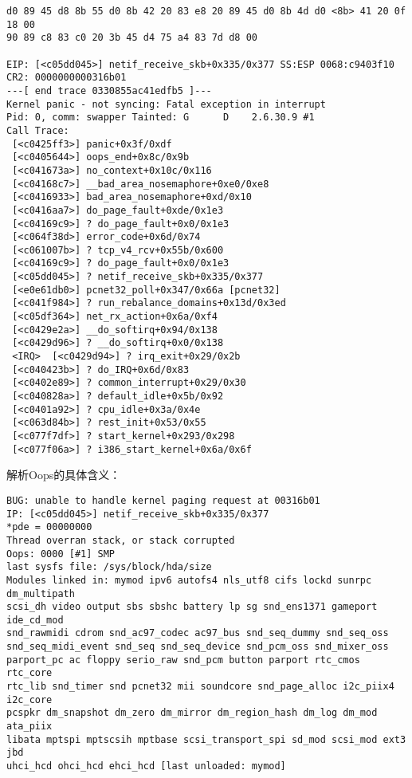 \begin{lstlisting}
d0 89 45 d8 8b 55 d0 8b 42 20 83 e8 20 89 45 d0 8b 4d d0 <8b> 41 20 0f 18 00 
90 89 c8 83 c0 20 3b 45 d4 75 a4 83 7d d8 00

EIP: [<c05dd045>] netif_receive_skb+0x335/0x377 SS:ESP 0068:c9403f10
CR2: 0000000000316b01
---[ end trace 0330855ac41edfb5 ]---
Kernel panic - not syncing: Fatal exception in interrupt
Pid: 0, comm: swapper Tainted: G      D    2.6.30.9 #1
Call Trace:
 [<c0425ff3>] panic+0x3f/0xdf
 [<c0405644>] oops_end+0x8c/0x9b
 [<c041673a>] no_context+0x10c/0x116
 [<c04168c7>] __bad_area_nosemaphore+0xe0/0xe8
 [<c0416933>] bad_area_nosemaphore+0xd/0x10
 [<c0416aa7>] do_page_fault+0xde/0x1e3
 [<c04169c9>] ? do_page_fault+0x0/0x1e3
 [<c064f38d>] error_code+0x6d/0x74
 [<c061007b>] ? tcp_v4_rcv+0x55b/0x600
 [<c04169c9>] ? do_page_fault+0x0/0x1e3
 [<c05dd045>] ? netif_receive_skb+0x335/0x377
 [<e0e61db0>] pcnet32_poll+0x347/0x66a [pcnet32]
 [<c041f984>] ? run_rebalance_domains+0x13d/0x3ed
 [<c05df364>] net_rx_action+0x6a/0xf4
 [<c0429e2a>] __do_softirq+0x94/0x138
 [<c0429d96>] ? __do_softirq+0x0/0x138
 <IRQ>  [<c0429d94>] ? irq_exit+0x29/0x2b
 [<c040423b>] ? do_IRQ+0x6d/0x83
 [<c0402e89>] ? common_interrupt+0x29/0x30
 [<c040828a>] ? default_idle+0x5b/0x92
 [<c0401a92>] ? cpu_idle+0x3a/0x4e
 [<c063d84b>] ? rest_init+0x53/0x55
 [<c077f7df>] ? start_kernel+0x293/0x298
 [<c077f06a>] ? i386_start_kernel+0x6a/0x6f
\end{lstlisting}

 

 

解析Oops的具体含义：

\begin{lstlisting}
BUG: unable to handle kernel paging request at 00316b01
IP: [<c05dd045>] netif_receive_skb+0x335/0x377
*pde = 00000000
Thread overran stack, or stack corrupted
Oops: 0000 [#1] SMP
last sysfs file: /sys/block/hda/size
Modules linked in: mymod ipv6 autofs4 nls_utf8 cifs lockd sunrpc dm_multipath 
scsi_dh video output sbs sbshc battery lp sg snd_ens1371 gameport ide_cd_mod 
snd_rawmidi cdrom snd_ac97_codec ac97_bus snd_seq_dummy snd_seq_oss 
snd_seq_midi_event snd_seq snd_seq_device snd_pcm_oss snd_mixer_oss 
parport_pc ac floppy serio_raw snd_pcm button parport rtc_cmos rtc_core 
rtc_lib snd_timer snd pcnet32 mii soundcore snd_page_alloc i2c_piix4 i2c_core 
pcspkr dm_snapshot dm_zero dm_mirror dm_region_hash dm_log dm_mod ata_piix 
libata mptspi mptscsih mptbase scsi_transport_spi sd_mod scsi_mod ext3 jbd 
uhci_hcd ohci_hcd ehci_hcd [last unloaded: mymod]
\end{lstlisting}

